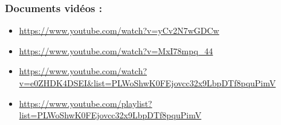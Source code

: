 \documentclass{article}
\begin{document}
\subsubsection{Documents vidéos :}
\begin{itemize}
    \item \url{https://www.youtube.com/watch?v=yCv2N7wGDCw}
    \item \url{https://www.youtube.com/watch?v=MxI78mpq_44}
    \item \url{https://www.youtube.com/watch?v=e0ZHDK4DSEI&list=PLWoShwK0FEjovcc32x9LbpDTf8pquPimV}
    \item \url{https://www.youtube.com/playlist?list=PLWoShwK0FEjovcc32x9LbpDTf8pquPimV} \\
\end{itemize}
\end{document}
